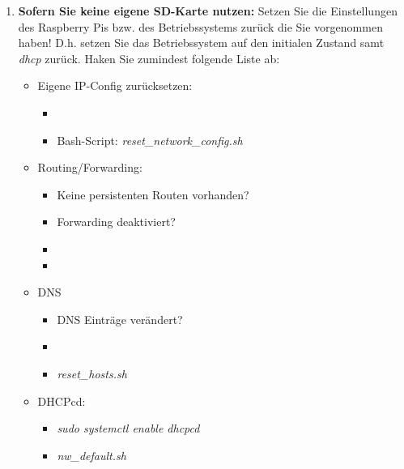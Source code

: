 \documentclass[paper=a4,fontsize=11pt]{scrartcl}%
\numberwithin{equation}{section}
\begin{document}
\begin{enumerate}
\item \textbf{Sofern Sie keine eigene SD-Karte nutzen:} Setzen Sie die Einstellungen des Raspberry Pis bzw. des Betriebssystems zurück die Sie vorgenommen haben! D.h. setzen Sie das Betriebssystem auf den initialen Zustand samt \emph{dhcp} zurück. Haken Sie zumindest folgende Liste ab:
\begin{itemize}
	\item Eigene IP-Config zurücksetzen:
	\begin{itemize}
		\item {}
		\item Bash-Script: \emph{reset\_network\_config.sh}
	\end{itemize}
	\item Routing/Forwarding:
	\begin{itemize}
		\item Keine persistenten Routen vorhanden?
		\item Forwarding deaktiviert? 
		\item {}
		\item {}
	\end{itemize}
	\item DNS
	\begin{itemize}
		\item DNS Einträge verändert?
		\item {}
		\item \emph{reset\_hosts.sh}
	\end{itemize}
	\item DHCPcd:
	\begin{itemize}
		\item \emph{sudo systemctl enable dhcpcd}
		\item \emph{nw\_default.sh}
	\end{itemize}
\end{itemize}
\end{enumerate}
\end{document}
